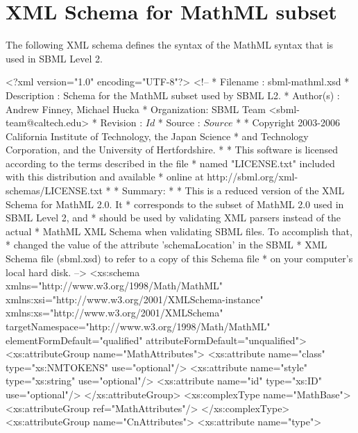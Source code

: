 
\section{XML Schema for MathML subset}
\label{apdx:mathml-subset-schema}

The following XML schema defines the syntax of the MathML syntax
that is used in SBML Level 2.

\begin{example}\begin{footnotesize}
<?xml version="1.0" encoding="UTF-8"?>
<!--
 * Filename    : sbml-mathml.xsd
 * Description : Schema for the MathML subset used by SBML L2.
 * Author(s)   : Andrew Finney, Michael Hucka
 * Organization: SBML Team <sbml-team@caltech.edu>
 * Revision    : $Id$
 * Source      : $Source$
 *
 * Copyright 2003-2006 California Institute of Technology, the Japan Science
 * and Technology Corporation, and the University of Hertfordshire.
 *
 * This software is licensed according to the terms described in the file
 * named "LICENSE.txt" included with this distribution and available
 * online at http://sbml.org/xml-schemas/LICENSE.txt
 *
 * Summary:
 * 
 * This is a reduced version of the XML Schema for MathML 2.0.  It 
 * corresponds to the subset of MathML 2.0 used in SBML Level 2, and
 * should be used by validating XML parsers instead of the actual
 * MathML XML Schema when validating SBML files.  To accomplish that,
 * changed the value of the attribute 'schemaLocation' in the SBML
 * XML Schema file (sbml.xsd) to refer to a copy of this Schema file
 * on your computer's local hard disk.
-->
<xs:schema xmlns="http://www.w3.org/1998/Math/MathML" 
           xmlns:xsi="http://www.w3.org/2001/XMLSchema-instance" 
           xmlns:xs="http://www.w3.org/2001/XMLSchema" 
           targetNamespace="http://www.w3.org/1998/Math/MathML" 
           elementFormDefault="qualified" 
           attributeFormDefault="unqualified">
    <xs:attributeGroup name="MathAttributes">
        <xs:attribute name="class" type="xs:NMTOKENS" use="optional"/>
        <xs:attribute name="style" type="xs:string" use="optional"/>
        <xs:attribute name="id" type="xs:ID" use="optional"/>
    </xs:attributeGroup>
    <xs:complexType name="MathBase">
        <xs:attributeGroup ref="MathAttributes"/>
    </xs:complexType>
    <xs:attributeGroup name="CnAttributes">
        <xs:attribute name="type">

\end{footnotesize}
\end{example}
